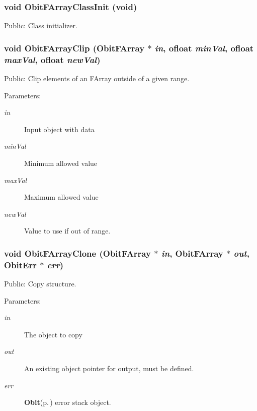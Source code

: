 \subsubsection{\setlength{\rightskip}{0pt plus 5cm}void Obit\-FArray\-Class\-Init (void)}\label{ObitFArray_8h_a54}


Public: Class initializer. 

\subsubsection{\setlength{\rightskip}{0pt plus 5cm}void Obit\-FArray\-Clip ({\bf Obit\-FArray} $\ast$ {\em in}, {\bf ofloat} {\em min\-Val}, {\bf ofloat} {\em max\-Val}, {\bf ofloat} {\em new\-Val})}\label{ObitFArray_8h_a86}


Public: Clip elements of an FArray outside of a given range. 

\begin{Desc}
\item[Parameters:]
\begin{description}
\item[{\em in}]Input object with data \item[{\em min\-Val}]Minimum allowed value \item[{\em max\-Val}]Maximum allowed value \item[{\em new\-Val}]Value to use if out of range. \end{description}
\end{Desc}
\subsubsection{\setlength{\rightskip}{0pt plus 5cm}void Obit\-FArray\-Clone ({\bf Obit\-FArray} $\ast$ {\em in}, {\bf Obit\-FArray} $\ast$ {\em out}, {\bf Obit\-Err} $\ast$ {\em err})}\label{ObitFArray_8h_a59}


Public: Copy structure. 

\begin{Desc}
\item[Parameters:]
\begin{description}
\item[{\em in}]The object to copy \item[{\em out}]An existing object pointer for output, must be defined. \item[{\em err}]{\bf Obit}{\rm (p.\,\pageref{structObit})} error stack object. \end{description}
\end{Desc}
